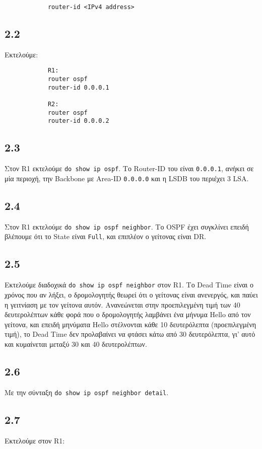\documentclass[a4paper, 12pt]{article}
\begin{document}
		\begin{verbatim}
			router-id <IPv4 address>
		\end{verbatim}

	\subsection*{2.2}
		Εκτελούμε:
		
		\begin{verbatim}
			R1:
			router ospf
			router-id 0.0.0.1
			
			R2:
			router ospf
			router-id 0.0.0.2
		\end{verbatim}

	\subsection*{2.3}
		Στον R1 εκτελούμε \verb|do show ip ospf|. Το Router-ID του είναι \verb|0.0.0.1|, ανήκει σε μία περιοχή, την Backbone με Area-ID \verb|0.0.0.0| και η LSDB του περιέχει 3 LSA.

	\subsection*{2.4}
		Στον R1 εκτελούμε \verb|do show ip ospf neighbor|. Το OSPF έχει συγκλίνει επειδή βλέπουμε ότι το State είναι \verb|Full|, και επιπλέον ο γείτονας είναι DR.

	\subsection*{2.5}
		Εκτελούμε διαδοχικά \verb|do show ip ospf neighbor| στον R1. Το Dead Time είναι ο χρόνος που αν λήξει, ο δρομολογητής θεωρεί ότι ο γείτονας είναι ανενεργός, και παύει η γειτνίαση με τον γείτονα αυτόν. Ανανεώνεται στην προεπιλεγμένη τιμή των 40 δευτερολέπτων κάθε φορά που ο δρομολογητής λαμβάνει ένα μήνυμα Hello από τον γείτονα, και επειδή μηνύματα Hello στέλνονται κάθε 10 δευτερόλεπτα (προεπιλεγμένη τιμή), το Dead Time δεν προλαβαίνει να φτάσει κάτω από 30 δευτερόλεπτα, γι' αυτό και κυμαίνεται μεταξύ 30 και 40 δευτερολέπτων.

	\subsection*{2.6}
		Με την σύνταξη \verb|do show ip ospf neighbor detail|.

	\subsection*{2.7}
		Εκτελούμε στον R1:
		
\end{document}
